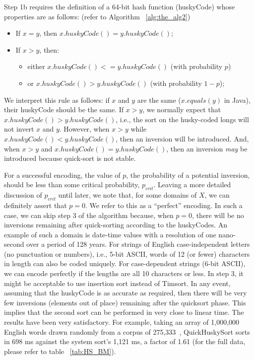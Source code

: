 \documentclass[twoside,leqno,twocolumn]{article}
\begin{document}
Step 1b requires the definition of a 64-bit hash function (huskyCode) whose properties are as follows:
(refer to Algorithm ~\ref{alg:the_alg2})
\begin{itemize}
                        \item {}If $x = y$, then $x.huskyCode() = y.huskyCode()$;
                        \item {}If $x > y$, then: 
                            \begin{itemize}
                            \item{} either $x.huskyCode() <= y.huskyCode()$ (with probability $p$)
                            \item{} or $x.huskyCode() > y.huskyCode()$ (with probability $1-p$);
                            
                            \end{itemize}
                        
                        \end{itemize}


We interpret this rule as follows:
if $x$ and $y$ are the same ($x.equals(y)$ in Java), their huskyCode should be the same.
If $x > y$, we normally expect that $x.huskyCode() > y.huskyCode()$, i.e., the sort on the husky-coded longs will not invert $x$ and $y$.
However, when $x > y$ while $x.huskyCode() < y.huskyCode()$, then an inversion will be introduced.
And, when $x > y$ and $x.huskyCode() = y.huskyCode()$, then an inversion \emph{may} be introduced because quick-sort is not stable.~\cite{6115063}

For a successful encoding, the value of $p$, the probability of a potential inversion, should be less than some critical probability, $p_{crit}$.
Leaving a more detailed discussion of $p_{crit}$ until later, we note that, for some domains of $X$, we can definitely assert that $p = 0$.
We refer to this as a “perfect” encoding.
In such a case, we can skip step 3 of the algorithm because, when $p = 0$, there will be no inversions remaining after quick-sorting according to the huskyCodes.
An example of such a domain is date-time values with a resolution of one nano-second over a period of 128 years.
For strings of English case-independent letters (no punctuation or numbers), i.e., 5-bit ASCII, words of 12 (or fewer) characters in length can also be coded uniquely.
For case-dependent strings (6-bit ASCII), we can encode perfectly if the lengths are all 10 characters or less.
In step 3, it might be acceptable to use insertion sort instead of Timsort.
In any event, assuming that the huskyCode is as accurate as required, then there will be very few inversions (elements out of place) remaining after the quicksort phase.
This implies that the second sort can be performed in very close to linear time.
The results have been very satisfactory.
For example, taking an array of 1,000,000 English words drawn randomly from a corpus of 275,333~\cite{GOLDHAHN12.327},
QuickHuskySort sorts in 698 ms against the system sort's 1,121 ms, a factor of 1.61
(for the full data, please refer to table ~\ref{tab:HS_BM}).
\end{document}
